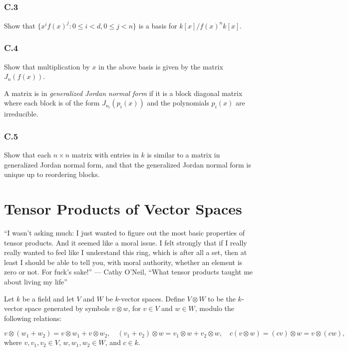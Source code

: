 \documentclass[lang=cn,11pt]{template}
\begin{document}
\subsection*{C.3} Show that \( \{ x^i f(x)^j : 0 \leq i < d, 0 \leq j < n \} \) is a basis for \( k[x] / f(x)^n k[x] \).

\subsection*{C.4} Show that multiplication by \( x \) in the above basis is given by the matrix \( J_n(f(x)) \).

\begin{definition}
A matrix is in \textit{generalized Jordan normal form} if it is a block diagonal matrix where each block is of the form \( J_{n_i}(p_i(x)) \) and the polynomials \( p_i(x) \) are irreducible.
\end{definition}

\subsection*{C.5} Show that each \( n \times n \) matrix with entries in \( k \) is similar to a matrix in generalized Jordan normal form, and that the generalized Jordan normal form is unique up to reordering blocks.









\chapter{Tensor Products of Vector Spaces}

“I wasn’t asking much: I just wanted to figure out the most basic properties of tensor products. And it seemed like a moral
issue. I felt strongly that if I really really wanted to feel like I understand this ring, which is after all a set, then at least I
should be able to tell you, with moral authority, whether an element is zero or not. For fuck’s sake!”
— Cathy O’Neil, “What tensor products taught me about living my life”

Let \( k \) be a field and let \( V \) and \( W \) be \( k \)-vector spaces. Define \( V \otimes W \) to be the \( k \)-vector space generated by symbols
\( v \otimes w \), for \( v \in V \) and \( w \in W \), modulo the following relations:

\[
v \otimes (w_1 + w_2) = v \otimes w_1 + v \otimes w_2, \quad (v_1 + v_2) \otimes w = v_1 \otimes w + v_2 \otimes w, \quad c(v \otimes w) = (cv) \otimes w = v \otimes (cw),
\]
where \( v, v_1, v_2 \in V \), \( w, w_1, w_2 \in W \), and \( c \in k \).
\end{document}
